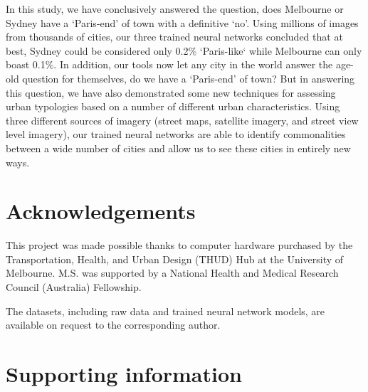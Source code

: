 \documentclass[10pt,letterpaper,hidelinks]{article}
\begin{document}
In this study, we have conclusively answered the question, does Melbourne or Sydney have a `Paris-end' of town with a definitive `no'. Using millions of images from thousands of cities, our three trained neural networks concluded that at best, Sydney could be considered only 0.2\% `Paris-like` while Melbourne can only boast 0.1\%. In addition, our tools now let any city in the world answer the age-old question for themselves, do we have a `Paris-end' of town? But in answering this question, we have also demonstrated some new techniques for assessing urban typologies based on a number of different urban characteristics. Using three different sources of imagery (street maps, satellite imagery, and street view level imagery), our trained neural networks are able to identify commonalities between a wide number of cities and allow us to see these cities in entirely new ways.  



\section*{Acknowledgements}\label{sec:acknowledgements}
This project was made possible thanks to computer hardware purchased by the Transportation, Health, and Urban Design (THUD) Hub at the University of Melbourne. M.S. was supported by a National Health and Medical Research Council (Australia) Fellowship.

The datasets, including raw data and trained neural network models, are available on request to the corresponding author.


\nolinenumbers

%
%
% 
\begin{thebibliography}{}

% 
% 



\end{thebibliography}


\section*{Supporting information}
\end{document}
